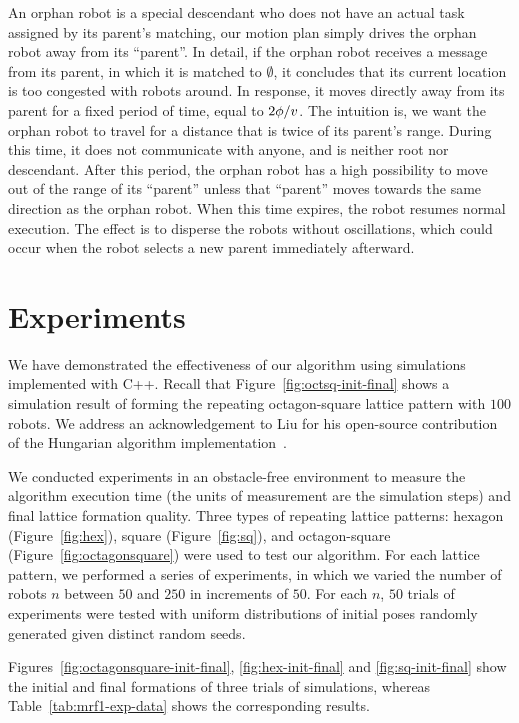 An orphan robot is a special descendant who does not have an actual task assigned by its parent's matching, our motion plan simply drives the orphan robot away from its ``parent''. 
%
In detail, if the orphan robot receives a message from its parent, in which it is matched to $\emptyset$, it concludes that its current location is too congested with robots around.
%
In response, it moves directly away from its parent for a fixed period of time, equal to $2\phi/v$.
%
The intuition is, we want the orphan robot to travel for a distance that is twice of its parent's range.
%
During this time, it does not communicate with anyone, and is neither root nor descendant. 
%
After this period, the orphan robot has a high possibility to move out of the range of its ``parent'' unless that ``parent'' moves towards the same direction as the orphan robot.
%
When this time expires, the robot resumes normal execution. 
%
The effect is to disperse the robots without oscillations, which could occur when the robot selects a new parent immediately afterward.


\section{Experiments}
\label{sec:mrf-exp}
We have demonstrated the effectiveness of our algorithm using simulations implemented with C++. 
%
Recall that Figure~\ref{fig:octsq-init-final} shows a simulation result of forming the repeating octagon-square lattice pattern with $100$ robots.
%
We address an acknowledgement to Liu for his open-source contribution of the Hungarian algorithm implementation~\cite{LiuShe11, LiuShe12a}.


We conducted experiments in an obstacle-free environment to measure the algorithm execution time (the units of measurement are the simulation steps) and final lattice formation quality. 
%
Three types of repeating lattice patterns: hexagon (Figure~\ref{fig:hex}), square (Figure~\ref{fig:sq}), and octagon-square (Figure~\ref{fig:octagonsquare}) were used to test our algorithm.
%
For each lattice pattern, we performed a series of experiments, in which we varied the number of robots $n$ between $50$ and $250$ in increments of $50$.  
%
For each $n$, $50$ trials of experiments were tested with uniform distributions of initial poses randomly generated given distinct random seeds.

Figures~\ref{fig:octagonsquare-init-final}, \ref{fig:hex-init-final} and \ref{fig:sq-init-final} show the initial and final formations of three trials of simulations, whereas Table~\ref{tab:mrf1-exp-data} shows the corresponding results.
%

